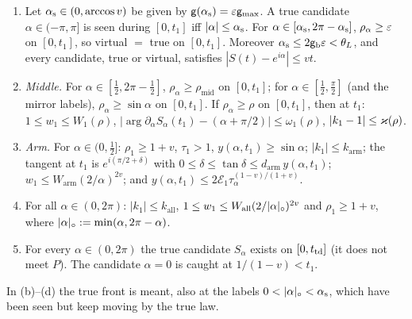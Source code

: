 \begin{lemma}[run 1]\label{lem:run1}
\begin{enumerate}
\item[(a)] Let $\alpha_{\mathrm s}\in(0,\arccos v)$ be given by $\mathsf g(\alpha_{\mathrm s})=\varepsilon\mathsf g_{\max}$. A true candidate $\alpha\in(-\pi,\pi]$ is seen during
$[0,t_1]$ iff $|\alpha|\le\alpha_{\mathrm s}$. For $\alpha\in[\alpha_{\mathrm s},2\pi-\alpha_{\mathrm s}]$, $\rho_\alpha\ge\varepsilon$ on $[0,t_1]$, so virtual $=$ true on $[0,t_1]$.
Moreover $\alpha_{\mathrm s}\le2\mathsf g_{\mathrm b}\varepsilon<\theta_L$, and every candidate, true or virtual, satisfies $|S(t)-e^{i\alpha}|\le vt$.
\item[(b)] \emph{Middle.} For $\alpha\in[\frac12,2\pi-\frac12]$, $\rho_\alpha\ge\rho_{\mathrm{mid}}$ on $[0,t_1]$; for
$\alpha\in[\frac12,\frac\pi2]$ (and the mirror labels), $\rho_\alpha\ge\sin\alpha$ on $[0,t_1]$. If $\rho_\alpha\ge\rho$ on $[0,t_1]$,
then at $t_1$: $1\le w_1\le W_1(\rho)$, $|\arg\partial_\alpha S_\alpha(t_1)-(\alpha+\pi/2)|\le\omega_1(\rho)$, $|k_1-1|\le\varkappa(\rho)$.
\item[(c)] \emph{Arm.} For $\alpha\in(0,\frac12]$: $\rho_1\ge1+v$, $\tau_1>1$, $y(\alpha,t_1)\ge\sin\alpha$; $|k_1|\le k_{\mathrm{arm}}$;
the tangent at $t_1$ is $e^{i(\pi/2+\delta)}$ with $0\le\delta\le\tan\delta\le d_{\mathrm{arm}}\,y(\alpha,t_1)$;
$w_1\le W_{\mathrm{arm}}(2/\alpha)^{2v}$; and $y(\alpha,t_1)\le2\mathcal E_1\tau_\alpha^{(1-v)/(1+v)}$.
\item[(d)] For all $\alpha\in(0,2\pi)$: $|k_1|\le k_{\mathrm{all}}$, $1\le w_1\le W_{\mathrm{all}}(2/|\alpha|_\circ)^{2v}$ and
$\rho_1\ge1+v$, where $|\alpha|_\circ:=\min(\alpha,2\pi-\alpha)$.
\item[(e)] For every $\alpha\in(0,2\pi)$ the true candidate $S_\alpha$ exists on $[0,t_{\mathrm{td}}]$ (it does not meet $P$). The candidate
$\alpha=0$ is caught at $1/(1-v)<t_1$.
\end{enumerate}
In (b)--(d) the true front is meant, also at the labels $0<\circab\alpha<\as$, which have been seen but keep moving by the true law.
\end{lemma}
